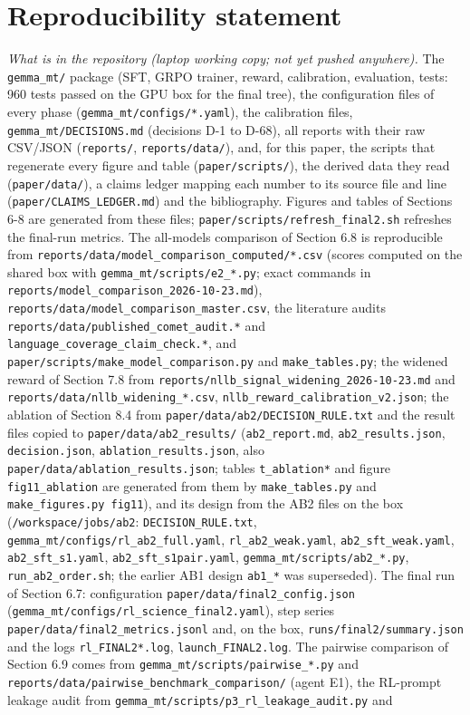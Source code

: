 \section{Reproducibility statement}\label{reproducibility-statement}

\emph{What is in the repository (laptop working copy; not yet pushed anywhere).} The \texttt{gemma\_mt/} package (SFT, GRPO trainer, reward, calibration, evaluation, tests: 960 tests passed on the GPU box for the final tree), the configuration files of every phase (\texttt{gemma\_mt/configs/*.yaml}), the calibration files, \texttt{gemma\_mt/DECISIONS.md} (decisions D-1 to D-68), all reports with their raw CSV/JSON (\texttt{reports/}, \texttt{reports/data/}), and, for this paper, the scripts that regenerate every figure and table (\texttt{paper/scripts/}), the derived data they read (\texttt{paper/data/}), a claims ledger mapping each number to its source file and line (\texttt{paper/CLAIMS\_LEDGER.md}) and the bibliography. Figures and tables of Sections 6-8 are generated from these files; \texttt{paper/scripts/refresh\_final2.sh} refreshes the final-run metrics. The all-models comparison of Section 6.8 is reproducible from \texttt{reports/data/model\_comparison\_computed/*.csv} (scores computed on the shared box with \texttt{gemma\_mt/scripts/e2\_*.py}; exact commands in \texttt{reports/model\_comparison\_2026-10-23.md}), \texttt{reports/data/model\_comparison\_master.csv}, the literature audits \texttt{reports/data/published\_comet\_audit.*} and \texttt{language\_coverage\_claim\_check.*}, and \texttt{paper/scripts/make\_model\_comparison.py} and \texttt{make\_tables.py}; the widened reward of Section 7.8 from \texttt{reports/nllb\_signal\_widening\_2026-10-23.md} and \texttt{reports/data/nllb\_widening\_*.csv}, \texttt{nllb\_reward\_calibration\_v2.json}; the ablation of Section 8.4 from \texttt{paper/data/ab2/DECISION\_RULE.txt} and the result files copied to \texttt{paper/data/ab2\_results/} (\texttt{ab2\_report.md}, \texttt{ab2\_results.json}, \texttt{decision.json}, \texttt{ablation\_results.json}, also \texttt{paper/data/ablation\_results.json}; tables \texttt{t\_ablation*} and figure \texttt{fig11\_ablation} are generated from them by \texttt{make\_tables.py} and \texttt{make\_figures.py\ fig11}), and its design from the AB2 files on the box (\texttt{/workspace/jobs/ab2}: \texttt{DECISION\_RULE.txt}, \texttt{gemma\_mt/configs/rl\_ab2\_full.yaml}, \texttt{rl\_ab2\_weak.yaml}, \texttt{ab2\_sft\_weak.yaml}, \texttt{ab2\_sft\_s1.yaml}, \texttt{ab2\_sft\_s1pair.yaml}, \texttt{gemma\_mt/scripts/ab2\_*.py}, \texttt{run\_ab2\_order.sh}; the earlier AB1 design \texttt{ab1\_*} was superseded). The final run of Section 6.7: configuration \texttt{paper/data/final2\_config.json} (\texttt{gemma\_mt/configs/rl\_science\_final2.yaml}), step series \texttt{paper/data/final2\_metrics.jsonl} and, on the box, \texttt{runs/final2/summary.json} and the logs \texttt{rl\_FINAL2*.log}, \texttt{launch\_FINAL2.log}. The pairwise comparison of Section 6.9 comes from \texttt{gemma\_mt/scripts/pairwise\_*.py} and \texttt{reports/data/pairwise\_benchmark\_comparison/} (agent E1), the RL-prompt leakage audit from \texttt{gemma\_mt/scripts/p3\_rl\_leakage\_audit.py} and 